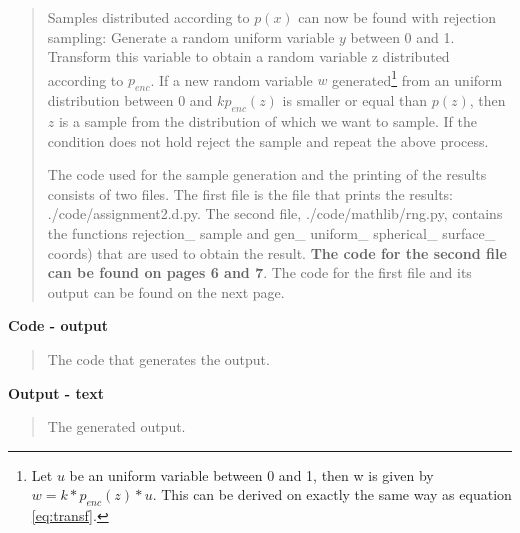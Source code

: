 \begin{quote}
Samples distributed according to $p(x)$ can now be found with rejection sampling:  Generate a random uniform variable $y$ between 0 and 1. Transform this variable to obtain a random variable z distributed according to $p_{enc}$. If a new random variable $w$ generated\footnote{Let $u$ be an uniform variable between 0 and 1, then w is given by $w = k*p_{enc}(z)*u$. This can be derived on exactly the same way as equation \ref{eq:transf}.} from an uniform distribution between 0 and $k p_{enc}(z)$  is smaller or equal than $ p(z)$, then $z$ is a sample from the distribution of which we want to sample. If the condition does not hold reject the sample and repeat the above process.    



The code used for the sample generation and the printing of the results consists of two files. The first file is the file that prints the results: \textsf{./code/assignment2.d.py}.  The second file, \textsf{./code/mathlib/rng.py}, contains the functions \textsf{rejection\_ sample} and \textsf{gen\_ uniform\_ spherical\_ surface\_ coords}) that are used to obtain the result. \textbf{The code for the second file can be found on pages 6 and 7}. The code for the first file and its output can be found on the next page.


\end{quote}

\textbf{Code - output}
\begin{quote}

The code that generates the output. 

\end{quote}

\textbf{Output - text}
\begin{quote}
The generated output.

\end{quote}











